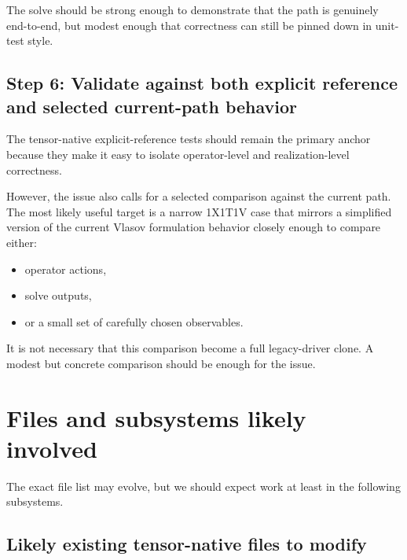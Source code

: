\documentclass[11pt]{article}
\begin{document}
The solve should be strong enough to demonstrate that the path is genuinely end-to-end, but modest enough that correctness can still be pinned down in unit-test style.

\subsection{Step 6: Validate against both explicit reference and selected current-path behavior}

The tensor-native explicit-reference tests should remain the primary anchor because they make it easy to isolate operator-level and realization-level correctness.

However, the issue also calls for a selected comparison against the current path. The most likely useful target is a narrow 1X1T1V case that mirrors a simplified version of the current Vlasov formulation behavior closely enough to compare either:
\begin{itemize}[leftmargin=2em]
\item operator actions,
\item solve outputs,
\item or a small set of carefully chosen observables.
\end{itemize}

It is not necessary that this comparison become a full legacy-driver clone. A modest but concrete comparison should be enough for the issue.

\section{Files and subsystems likely involved}

The exact file list may evolve, but we should expect work at least in the following subsystems.

\subsection{Likely existing tensor-native files to modify}
\end{document}
